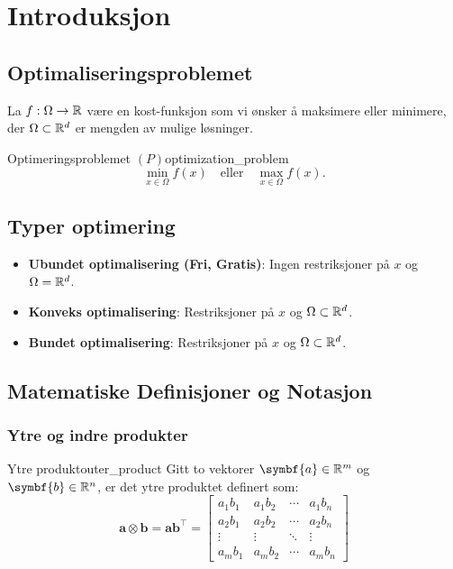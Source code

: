 \chapter{Introduksjon}

\section{Optimaliseringsproblemet}

La \(f: \Omega \to \mathbb{R}\) være en kost-funksjon som vi ønsker å maksimere eller minimere, der \(\Omega \subset \mathbb{R}^d\) er mengden av mulige løsninger.

\begin{definition}{Optimeringsproblemet \((P)\)}{optimization_problem}
  \[
    \min_{x \in \Omega} f(x) \quad \text{eller} \quad \max_{x \in \Omega} f(x).
  \]

\end{definition}

\section*{Typer optimering}

\begin{itemize}
  \item \textbf{Ubundet optimalisering (Fri, Gratis)}: Ingen restriksjoner på \(x\) og \(\Omega = \mathbb{R}^d\).
  \item \textbf{Konveks optimalisering}: Restriksjoner på \(x\) og \(\Omega \subset \mathbb{R}^d\).
  \item \textbf{Bundet optimalisering}: Restriksjoner på \(x\) og \(\Omega \subset \mathbb{R}^d\).
\end{itemize}

\section{Matematiske Definisjoner og Notasjon}

\subsection{Ytre og indre produkter}
\begin{definition}{Ytre produkt}{outer_product}
  Gitt to vektorer \( \symbf{a} \in \R^m \) og \( \symbf{b} \in \R^n \), er det ytre produktet definert som:
  \[
    \symbf{a} \otimes \symbf{b} = \symbf{a} \symbf{b}^\top =
    \begin{bmatrix}
      a_1b_1 & a_1b_2 & \cdots & a_1b_n \\
      a_2b_1 & a_2b_2 & \cdots & a_2b_n \\
      \vdots & \vdots & \ddots & \vdots \\
      a_mb_1 & a_mb_2 & \cdots & a_mb_n
    \end{bmatrix}
  \]
\end{definition}


